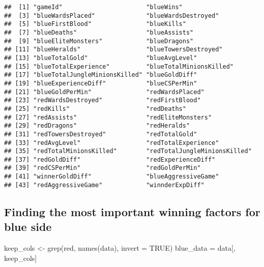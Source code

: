\documentclass[
]{article}
\newenvironment{Shaded}{\begin{snugshade}}{\end{snugshade}}
\newcommand{\AttributeTok}[1]{\textcolor[rgb]{0.77,0.63,0.00}{#1}}
\newcommand{\ConstantTok}[1]{\textcolor[rgb]{0.00,0.00,0.00}{#1}}
\newcommand{\FunctionTok}[1]{\textcolor[rgb]{0.00,0.00,0.00}{#1}}
\newcommand{\NormalTok}[1]{#1}
\newcommand{\OtherTok}[1]{\textcolor[rgb]{0.56,0.35,0.01}{#1}}
\newcommand{\StringTok}[1]{\textcolor[rgb]{0.31,0.60,0.02}{#1}}
\begin{document}
\begin{verbatim}
##  [1] "gameId"                       "blueWins"                    
##  [3] "blueWardsPlaced"              "blueWardsDestroyed"          
##  [5] "blueFirstBlood"               "blueKills"                   
##  [7] "blueDeaths"                   "blueAssists"                 
##  [9] "blueEliteMonsters"            "blueDragons"                 
## [11] "blueHeralds"                  "blueTowersDestroyed"         
## [13] "blueTotalGold"                "blueAvgLevel"                
## [15] "blueTotalExperience"          "blueTotalMinionsKilled"      
## [17] "blueTotalJungleMinionsKilled" "blueGoldDiff"                
## [19] "blueExperienceDiff"           "blueCSPerMin"                
## [21] "blueGoldPerMin"               "redWardsPlaced"              
## [23] "redWardsDestroyed"            "redFirstBlood"               
## [25] "redKills"                     "redDeaths"                   
## [27] "redAssists"                   "redEliteMonsters"            
## [29] "redDragons"                   "redHeralds"                  
## [31] "redTowersDestroyed"           "redTotalGold"                
## [33] "redAvgLevel"                  "redTotalExperience"          
## [35] "redTotalMinionsKilled"        "redTotalJungleMinionsKilled" 
## [37] "redGoldDiff"                  "redExperienceDiff"           
## [39] "redCSPerMin"                  "redGoldPerMin"               
## [41] "winnerGoldDiff"               "blueAggressiveGame"          
## [43] "redAggressiveGame"            "winnderExpDiff"
\end{verbatim}

\hypertarget{finding-the-most-important-winning-factors-for-blue-side}{%
\subsection{Finding the most important winning factors for blue
side}\label{finding-the-most-important-winning-factors-for-blue-side}}

\begin{Shaded}
\begin{Highlighting}[]
\NormalTok{keep\_cols }\OtherTok{\textless{}{-}} \FunctionTok{grep}\NormalTok{(}\StringTok{\textquotesingle{}red\textquotesingle{}}\NormalTok{, }\FunctionTok{names}\NormalTok{(data), }\AttributeTok{invert =} \ConstantTok{TRUE}\NormalTok{)}
\NormalTok{blue\_data }\OtherTok{=}\NormalTok{ data[, keep\_cols]}
\end{Highlighting}
\end{Shaded}
\end{document}
